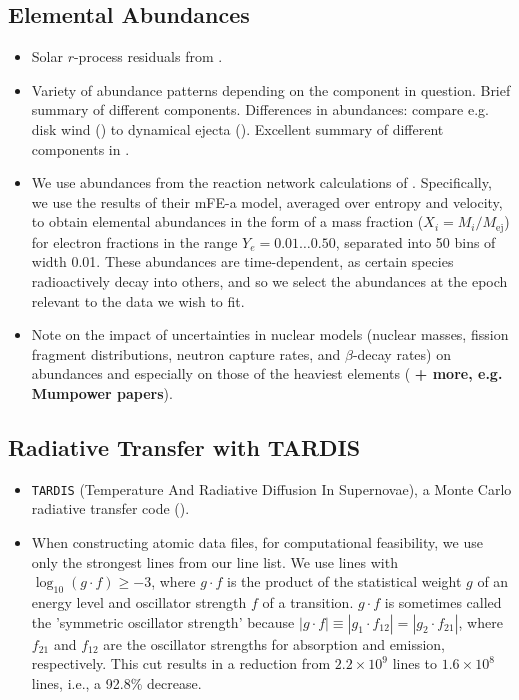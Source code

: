 \documentclass[twocolumn]{aastex63}
\begin{document}
\subsection{Elemental Abundances}
\begin{itemize}
    \item Solar $r$-process residuals from \cite{sneden08}.
    
    \item Variety of abundance patterns depending on the component in question. Brief summary of different components. Differences in abundances: compare e.g. disk wind (\citealt{wu16}) to dynamical ejecta (\citealt{wanajo14}). Excellent summary of different components in \cite{just15}. 
    
    \item We use abundances from the reaction network calculations of \cite{wanajo18}. Specifically, we use the results of their mFE-a model, averaged over entropy and velocity, to obtain elemental abundances in the form of a mass fraction ($X_{i} = M_{i} / M_{\mathrm{ej}}$) for electron fractions in the range $Y_e = 0.01 \ldots 0.50$, separated into 50 bins of width 0.01. These abundances are time-dependent, as certain species radioactively decay into others, and so we select the abundances at the epoch relevant to the data we wish to fit. 
    
    \item Note on the impact of uncertainties in nuclear models (nuclear masses, fission fragment distributions, neutron capture rates, and $\beta$-decay rates) on abundances and especially on those of the heaviest elements (\citealt{eichler15, barnes16, cote18} \textbf{+ more, e.g. Mumpower papers}).
\end{itemize}

\subsection{Radiative Transfer with \textsc{TARDIS}}\label{ssc:TARDIS}
\begin{itemize}

    \item \texttt{TARDIS} (Temperature And Radiative Diffusion In Supernovae), a Monte Carlo radiative transfer code (\citealt{kerzendorf14}).
    
    \item When constructing atomic data files, for computational feasibility, we use only the strongest lines from our line list. We use lines with $\log_{10}(g \cdot f) \geqslant -3$, where $g \cdot f$ is the product of the statistical weight $g$ of an energy level and oscillator strength $f$ of a transition. $g \cdot f$ is sometimes called the 'symmetric oscillator strength' because $|g\cdot f| \equiv |g_1 \cdot f_{12}| = |g_2 \cdot f_{21}|$, where $f_{21}$ and $f_{12}$ are the oscillator strengths for absorption and emission, respectively. This cut results in a reduction from $2.2 \times 10^9$ lines to $1.6 \times 10^8$ lines, i.e., a 92.8\% decrease.
\end{itemize}
\end{document}

